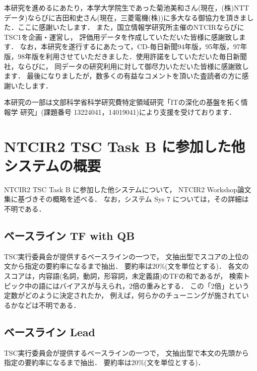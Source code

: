 \acknowledgment

本研究を進めるにあたり，本学大学院生であった菊池美和さん(現在，(株)NTTデータ)ならびに吉田和史さん(現在，三菱電機(株))に多大なる御協力を頂きました．ここに感謝いたします．
また，国立情報学研究所主催のNTCIRならびにTSC1を企画・運営し，
評価用データを作成していただいた皆様に感謝致します．
なお，本研究を遂行するにあたって，CD-毎日新聞94年版，95年版，97年版，98年版を利用させていただきました．使用許諾をしていただいた毎日新聞社，ならびに，
同データの研究利用に対して御尽力いただいた皆様に感謝致します．
最後になりましたが，数多くの有益なコメントを頂いた査読者の方に感謝いたします．

本研究の一部は文部科学省科学研究費特定領域研究「ITの深化の基盤を拓く情報学
研究」(課題番号 13224041，14019041)により支援を受けております．




\appendix
\section{NTCIR2 TSC Task B に参加した他システムの概要}
\label{Appendix:NTCIR2 TSC Task B に参加した他システムの概要}

NTCIR2 TSC Task B に参加した他システムについて，
NTCIR2 Workshop論文集に基づきその概略を述べる\cite{
Nobata:SentenceExtractionSystemAssemblingMultipleEvidence,
Nakao:HowSmallADistinctionAmongSummariesCanTheEvaluationMethodIdentify,
Hirao:TextSummarizationBasedOnHanningWindowAndDependencyStructureAnalysis,
Oka:PhraseRepresentationSummarizationMethodAndItsEvaluation
}．
なお，システム Sys 7 については，その詳細は不明である．

\subsection{ベースライン TF with QB}
TSC実行委員会が提供するベースラインの一つで，
文抽出型でスコアの上位の文から指定の要約率になるまで抽出．
要約率は20\%(文を単位とする)．
各文のスコアは，内容語(名詞，動詞，形容詞，未定義語)のTFの和であるが，
検索トピック中の語にはバイアスが与えられ，2倍の重みとする．
この「2倍」という定数がどのように決定されたか，
例えば，何らかのチューニングが施されているかなどは不明である．


\subsection{ベースライン Lead}
TSC実行委員会が提供するベースラインの一つで，
文抽出型で本文の先頭から指定の要約率になるまで抽出．
要約率は20\%(文を単位とする)．

